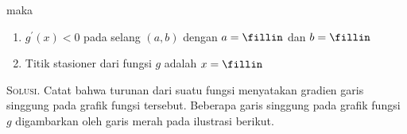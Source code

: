 \documentclass{exam}
\renewenvironment{proof}[1][Solusi.]{\ProofBox\strut\textsc{#1}\space}{\endProofBox}
\numberwithin{equation}{section}
\begin{document}
\begin{enumerate}
{\begin{tikzpicture}[x=0.75pt,y=0.75pt,yscale=-1,xscale=1]
\end{tikzpicture}
    \par}

maka
\begin{enumerate}
    \item $g^\prime(x) < 0$ pada selang $(a, b)$ dengan $a = \fillin$ dan $b = \fillin$
    \item Titik stasioner dari fungsi $g$ adalah $x = \fillin$
\end{enumerate}
\begin{proof}
    Catat bahwa turunan dari suatu fungsi menyatakan gradien garis singgung pada grafik fungsi tersebut. Beberapa garis singgung pada grafik fungsi $g$ digambarkan oleh garis merah pada ilustrasi berikut.

    {\centering
    \begin{tikzpicture}[x=0.75pt,y=0.75pt,yscale=-1,xscale=1]


\end{tikzpicture}}
\end{proof}
\end{enumerate}
\end{document}
